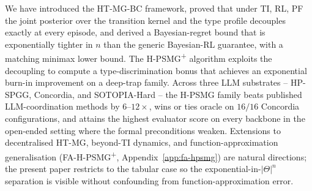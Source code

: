 We have introduced the HT-MG-BC framework, proved that under TI, RL, PF the joint posterior over the transition kernel and the type profile decouples exactly at every episode, and derived a Bayesian-regret bound that is exponentially tighter in $n$ than the generic Bayesian-RL guarantee, with a matching minimax lower bound. The H-PSMG\textsuperscript{+} algorithm exploits the decoupling to compute a type-discrimination bonus that achieves an exponential burn-in improvement on a deep-trap family. Across three LLM substrates -- HP-SPGG, Concordia, and SOTOPIA-Hard -- the H-PSMG family beats published LLM-coordination methods by $6$--$12\times$, wins or ties oracle on $16/16$ Concordia configurations, and attains the highest evaluator score on every backbone in the open-ended setting where the formal preconditions weaken. Extensions to decentralised HT-MG, beyond-TI dynamics, and function-approximation generalisation (FA-H-PSMG\textsuperscript{+}, Appendix~\ref{app:fa-hpsmg}) are natural directions; the present paper restricts to the tabular case so the exponential-in-$|\Theta|^n$ separation is visible without confounding from function-approximation error.

